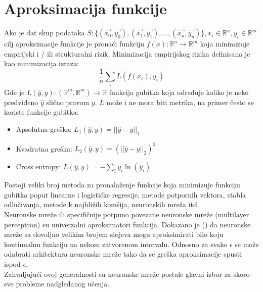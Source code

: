 \documentclass[a4paper,fleqn,12pt]{JMThesis}
\theoremstyle{plain}
\theoremstyle{definition}
\theoremstyle{definition}
\begin{document}
\section{Aproksimacija funkcije}
Ako je dat skup podataka $S: \{(\vec{x_0},\vec{y_0}),(\vec{x_1},\vec{y_1}),...,(\vec{x_n},\vec{y_n})\}, x_i \in \mathbb{R}^n, y_i \in \mathbb{R}^m$ cilj aproksimacije funkcije
je pronaći funkciju $f(x) : \mathbb{R}^n \rightarrow \mathbb{R}^m$ koja minimizuje empirijski i / ili strukturalni rizik. Minimizacija
empirijskog rizika definisana je kao minimizacija izraza:\\
\[ \frac{1}{n}\sum_i L(f(x_i),y_i) \]
Gde je $L(\hat{y},y) : (\mathbb{R}^m,\mathbb{R}^m) \rightarrow \mathbb{R}$ funkcija gubitka koja određuje koliko je neko predviđeno
$\hat{y}$ slično pravom $y$. $L$ može i ne mora biti metrika, na primer često se koriste funkcije gubitka:\\
\begin{itemize}
	\item Apsolutna greška: $L_1(\hat{y},y) = ||\hat{y} - y||_1$
 	\item Kvadratna greška: $L_2(\hat{y},y) = (||\hat{y} - y||_2)^2$
  	\item Cross entropy: $L(\hat{y},y) = -\sum_i y_i \ln(\hat{y}_i)$  
\end{itemize}
Postoji veliki broj metoda za pronalaženje funkcije koja minimizuje funkciju gubitka poput linearne i logističke regresije, 
metode potpornih vektora, stabla odlučivanja, metode k najbližih komšija, neuronskih mreža itd.\\
Neuronske mreže ili specifičnije potpuno povezane neuronske mreže (multilayer perceptron) su univerzalni aproksimatori funkcija.
Dokazano je (\cite{hanin2017approximating}) da neuronske mreže sa dovoljno velikim brojem slojeva mogu aproksimirati
bilo koju kontinualnu funkciju na nekom zatvorenom intervalu. Odnosno za svako $\epsilon$ se može odabrati arhitektura neuronske
mreže tako da se greška aproksimacije spusti ispod $\epsilon$.\\
Zahvaljujući ovoj generalnosti su neuronske mreže postale glavni izbor za skoro sve probleme nadgledanog učenja.
\end{document}
